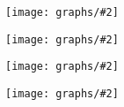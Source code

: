 \documentclass[twoside,12pt]{article}
\begin{document}

\newcommand{\fig}[2]{\begin{minipage}{0.45\textwidth}\centering \texttt{[image: graphs/\#2]} \end{minipage}}
\newcommand{\widefig}[2]{\begin{minipage}{0.45\textwidth}\centering \texttt{[image: graphs/\#2]} \end{minipage}}
\noindent

\fig{1.4}{mst}

\bigskip

\fig{1.2}{euler1}
\fig{1.2}{euler2}

\bigskip

\fig{.33}{icosian}

\end{document}
